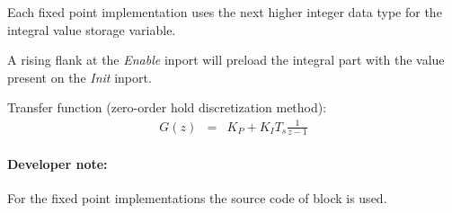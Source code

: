 Each fixed point implementation uses the next higher integer data type for the integral value storage variable.

A rising flank at the \textit{Enable} inport will preload the integral part with the value present on the \textit{Init} inport.
\newline

\noindent
Transfer function (zero-order hold discretization method):
\begin{eqnarray*}
	G(z) &=&  K_{P} + K_{I}T_{s}\frac{1}{z-1}
\end{eqnarray*}

\paragraph{Developer note:} For the fixed point implementations the source code of block  is used.
